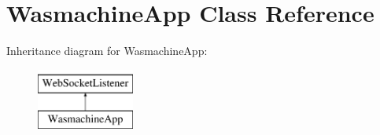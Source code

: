 \hypertarget{class_wasmachine_app}{}\section{Wasmachine\+App Class Reference}
\label{class_wasmachine_app}
Inheritance diagram for Wasmachine\+App\+:\begin{figure}[H]
\begin{center}
\leavevmode
\includegraphics[height=2.000000cm]{class_wasmachine_app}
\end{center}
\end{figure}
